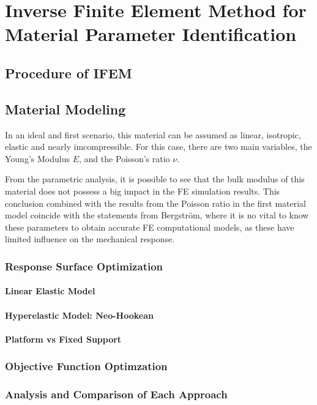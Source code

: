 
\chapter{Inverse Finite Element Method for Material Parameter Identification} %

\label{Chapter5} %

\section{Procedure of IFEM}
\section{Material Modeling}

In an ideal and first scenario, this material can be assumed as linear, isotropic, 
elastic and nearly imcompressible. For this case, there are two main variables, the Young's
Modulus \(E\), and the Poisson's ratio $\nu$.

From the parametric analysis, it is possible to see that the bulk 
modulus of this material does not possess a big impact in the FE 
simulation results. This conclusion combined with the results 
from the Poisson ratio in the first material model coincide with the 
statements from Bergström, where it is no vital to know these parameters 
to obtain accurate FE computational models, as these have limited
influence on the mechanical response. \cite{Bergström2015} %

\subsection{Response Surface Optimization}

\subsubsection*{Linear Elastic Model}

\subsubsection*{Hyperelastic Model: Neo-Hookean}

\subsubsection*{Platform vs Fixed Support} %


\subsection{Objective Function Optimzation}

\subsection{Analysis and Comparison of Each Approach}

